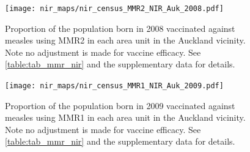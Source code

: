 \documentclass{article}
\begin{document}
% 
\begin{figure}
\begin{center}
    \texttt{[image: nir\_maps/nir\_census\_MMR2\_NIR\_Auk\_2008.pdf]}
 \end{center}
    \caption{Proportion of the population born in 2008 vaccinated against measles using MMR2 in each area unit in the Auckland vicinity. Note no adjustment is made for vaccine efficacy. See \autoref{table:tab_mmr_nir} and the supplementary data for details.}
\label{fig:fig22008_a}
\end{figure}
% 
% 
\begin{figure}
\begin{center}
    \texttt{[image: nir\_maps/nir\_census\_MMR1\_NIR\_Auk\_2009.pdf]}
 \end{center}
    \caption{Proportion of the population born in 2009 vaccinated against measles using MMR1 in each area unit in the Auckland vicinity. Note no adjustment is made for vaccine efficacy. See \autoref{table:tab_mmr_nir} and the supplementary data for details.}
\label{fig:fig12009_a}
\end{figure}
\end{document}
